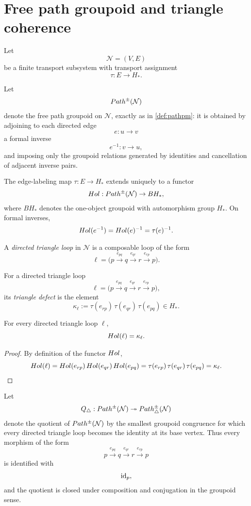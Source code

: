 \section{Free path groupoid and triangle coherence}
Let
\[
	\mathcal N=(V,E)
\]
be a finite transport subsystem with transport assignment
\[
	\tau:E\to H_*.
\]
\begin{definition}
	Let
	\[
		Path^\pm(\mathcal N)
	\]
	denote the free path groupoid on \(\mathcal N\), exactly as in
	\cref{def:pathpm}: it is obtained by adjoining to each directed edge
	\[
		e:u\to v
	\]
	a formal inverse
	\[
		e^{-1}:v\to u,
	\]
	and imposing only the groupoid relations generated by identities and
	cancellation of adjacent inverse pairs.
\end{definition}
\begin{definition}
	The edge-labeling map \(\tau:E\to H_*\) extends uniquely to a functor
	\[
		Hol:Path^\pm(\mathcal N)\to BH_*,
	\]
	where \(BH_*\) denotes the one-object groupoid with automorphism group
	\(H_*\). On formal inverses,
	\[
		Hol(e^{-1})=Hol(e)^{-1}=\tau(e)^{-1}.
	\]
\end{definition}
\begin{definition}
	\label{def:bridge-triangle-loop}
	A \emph{directed triangle loop} in \(\mathcal N\) is a composable loop
	of the form
	\[
		\ell=
		\bigl(
		p\xrightarrow{e_{pq}}q\xrightarrow{e_{qr}}r\xrightarrow{e_{rp}}p
		\bigr).
	\]
\end{definition}
\begin{definition}
	For a directed triangle loop
	\[
		\ell=
		\bigl(
		p\xrightarrow{e_{pq}}q\xrightarrow{e_{qr}}r\xrightarrow{e_{rp}}p
		\bigr),
	\]
	its \emph{triangle defect} is the element
	\[
		\kappa_\ell
		:=
		\tau(e_{rp})\,\tau(e_{qr})\,\tau(e_{pq})
		\in H_*.
	\]
\end{definition}
\begin{lemma}
	\label{lem:bridge-kappa-hol}
	For every directed triangle loop \(\ell\),
	\[
		Hol(\ell)=\kappa_\ell.
	\]
\end{lemma}
\begin{proof}
	By definition of the functor \(Hol\),
	\[
		Hol(\ell)
		=
		Hol(e_{rp})\,Hol(e_{qr})\,Hol(e_{pq})
		=
		\tau(e_{rp})\,\tau(e_{qr})\,\tau(e_{pq})
		=
		\kappa_\ell.
	\]
\end{proof}
\begin{definition}
	Let
	\[
		Q_\triangle:Path^\pm(\mathcal N)\twoheadrightarrow
		Path^\pm_\triangle(\mathcal N)
	\]
	denote the quotient of \(Path^\pm(\mathcal N)\) by the smallest
	groupoid congruence for which every directed triangle loop becomes the
	identity at its base vertex. Thus every morphism of the form
	\[
		p\xrightarrow{e_{pq}}q\xrightarrow{e_{qr}}r\xrightarrow{e_{rp}}p
	\]
	is identified with
	\[
		\operatorname{id}_p,
	\]
	and the quotient is closed under composition and conjugation in the
	groupoid sense.
\end{definition}
